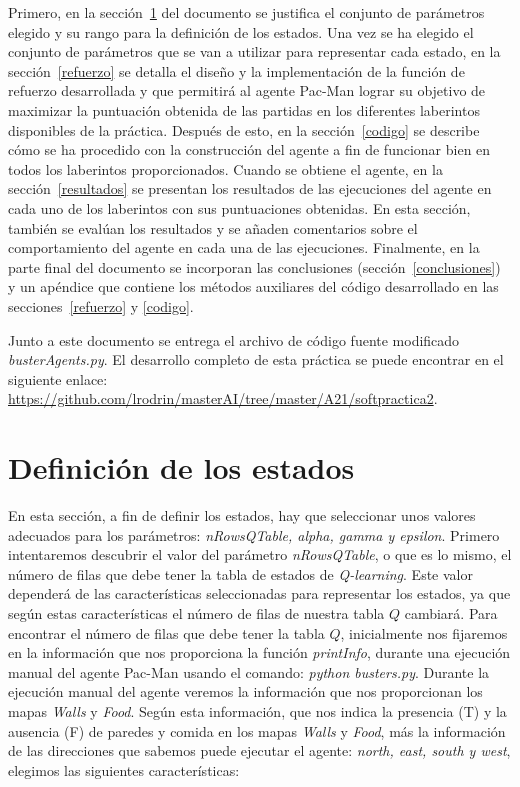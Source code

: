 \documentclass[11pt]{exam}
\begin{document}
Primero, en la sección~\ref{estados} del documento se justifica el conjunto de parámetros elegido y su rango para la definición de los estados. Una vez se ha elegido el conjunto de parámetros que se van a utilizar para representar cada estado, en la sección~\ref{refuerzo} se detalla el diseño y la implementación de la función de refuerzo desarrollada y que permitirá al agente Pac-Man lograr su objetivo de maximizar la puntuación obtenida de las partidas en los diferentes laberintos disponibles de la práctica. Después de esto, en la sección~\ref{codigo} se describe cómo se ha procedido con la construcción del agente a fin de funcionar bien en todos los laberintos proporcionados. Cuando se obtiene el agente, en la sección~\ref{resultados} se presentan los resultados de las ejecuciones del agente en cada uno de los laberintos con sus puntuaciones obtenidas. En esta sección, también se evalúan los resultados y se añaden comentarios sobre el comportamiento del agente en cada una de las ejecuciones. Finalmente, en la parte final del documento se incorporan las conclusiones (sección~\ref{conclusiones}) y un apéndice que contiene los métodos auxiliares del código desarrollado en las secciones~\ref{refuerzo} y \ref{codigo}.
\vspace*{4mm}

Junto a este documento se entrega el archivo de código fuente modificado \textit{busterAgents.py}. El desarrollo completo de esta práctica se puede encontrar en el siguiente enlace: \url{https://github.com/lrodrin/masterAI/tree/master/A21/softpractica2}.

\section{Definición de los estados}\label{estados}

En esta sección, a fin de definir los estados, hay que seleccionar unos valores adecuados para los parámetros: \textit{nRowsQTable, alpha, gamma y epsilon}. Primero intentaremos descubrir el valor del parámetro \textit{nRowsQTable}, o que es lo mismo, el número de filas que debe tener la tabla de estados de \textit{Q-learning}. Este valor dependerá de las características seleccionadas para representar los estados, ya que según estas características el número de filas de nuestra tabla $Q$ cambiará. Para encontrar el número de filas que debe tener la tabla $Q$, inicialmente nos fijaremos en la información que nos proporciona la función \textit{printInfo}, durante una ejecución manual del agente Pac-Man usando el comando: \textit{python busters.py}. Durante la ejecución manual del agente veremos la información que nos proporcionan los mapas \textit{Walls} y \textit{Food}. Según esta información, que nos indica la presencia (T) y la ausencia (F) de paredes y comida en los mapas \textit{Walls} y \textit{Food}, más la información de las direcciones que sabemos puede ejecutar el agente: \textit{north, east, south y west}, elegimos las siguientes características:
\end{document}
